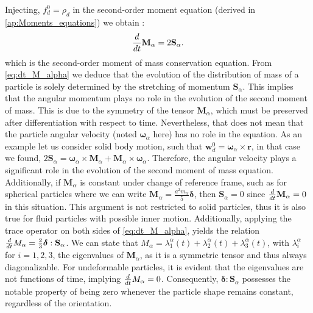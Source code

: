 Injecting, $f_d^0 = \rho_d$ in the second-order moment equation (derived in \ref{ap:Moments_equations}) we obtain :
\begin{equation}
    \frac{d}{dt} {\textbf{M}_\alpha}=2\textbf{S}_\alpha. 
    \label{eq:dt_M_alpha}
\end{equation}
which is the second-order moment of mass conservation equation. 
From \ref{eq:dt_M_alpha} we deduce that the evolution of the distribution of mass of a particle is solely determined by the stretching of momentum $\textbf{S}_\alpha$. 
This implies that the angular momentum plays no role in the evolution of the second moment of mass. 
This is due to the symmetry of the tensor $\textbf{M}_\alpha$, which must be preserved after differentiation with respect to time.
Nevertheless, that does not mean that the particle angular velocity (noted $\bm\omega_\alpha$ here) has no role in the equation. 
As an example let us consider solid body motion, such that $\textbf{w}_d^0 = \bm\omega_\alpha \times \textbf{r}$, in that case we found, $2\textbf{S}_\alpha = \bm\omega_\alpha \times \textbf{M}_\alpha+ \textbf{M}_\alpha\times \bm\omega_\alpha $. 
Therefore, the angular velocity plays a significant role in the evolution of the second moment of mass equation. 
Additionally, if $\textbf{M}_\alpha$ is constant under change of reference frame, such as for spherical particles where we can write $\textbf{M}_\alpha= \frac{a^2 m_\alpha}{5} \bm\delta$, then $\textbf{S}_\alpha=0$ since $\frac{d}{dt} \textbf{M}_\alpha = 0$ in this situation.
This argument is not restricted to solid particles, thus it is also true for fluid particles with possible inner motion. 
Additionally, applying the trace operator on both sides of \ref{eq:dt_M_alpha}, yields the relation $\frac{d}{dt} {M_\alpha}=\frac{2}{3}\bm\delta : \textbf{S}_\alpha$.
We can state that $M_\alpha = \lambda^\alpha_1(t)+\lambda^\alpha_2(t)+\lambda^\alpha_3(t)$, with $\lambda_i^\alpha$ for $i=1,2,3$, the eigenvalues of $\textbf{M}_\alpha$, as it is a symmetric tensor and thus always diagonalizable.
For undeformable particles, it is evident that the eigenvalues are not functions of time, implying $\frac{d}{dt} M_\alpha = 0$.  
Consequently, $\bm\delta : \textbf{S}_\alpha$ possesses the notable property of being zero whenever the particle shape remains constant, regardless of the orientation.

